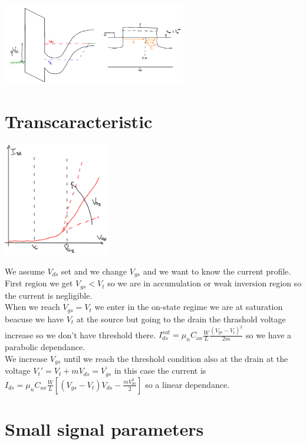 \centering
\includegraphics[width=0.6\textwidth]{2delectro.png}\\
\raggedright

\section{Transcaracteristic}

\centering
\includegraphics[width=0.35\textwidth]{transcaracteristic.png}\\
\raggedright

We assume $V_{ds}$ set and we change $V_{gs}$ and we want to know the current profile.\\
First region we get $V_{gs}<V_{t}$ so we are in accumulation or weak inversion region so the current is negligible.\\
When we reach $V_{gs}=V_t$ we enter in the on-state regime we are at saturation beacuse we have $V_{t}$ at the source but going to the drain the thrashold voltage increase so we don't have threshold there. $I_{ds}^{sat}=\mu_nC_{ox}\frac{W}{L}\frac{(V_{gs}-V_t)^2}{2m}$ so we have a parabolic dependance.\\
We increase $V_{gs}$ until we reach the threshold condition also at the drain at the voltage $V_t'=V_t+m V_{ds}=\overline{V_{gs}}$  in this case the current is $I_{ds}=\mu_nC_{ox}\frac{W}{L}[(V_{gs}-V_t)V_{ds}-\frac{mV_{ds}^2}{2}]$ so a linear dependance.\\

\section{Small signal parameters}

